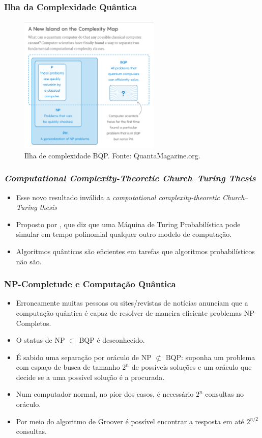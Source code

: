 \documentclass{beamer}
\begin{document}
\begin{frame}
  \frametitle{Ilha da Complexidade Quântica}
    \begin{figure}[h]
    \label{notph}
    \centering
    \includegraphics[width=0.6\textwidth]{island.jpg}
    \caption{Ilha de complexidade BQP. Fonte: QuantaMagazine.org.}
    \end{figure}
\end{frame}

\begin{frame}
\frametitle{\textit{Computational Complexity-Theoretic Church–Turing Thesis}} 
\begin{itemize}
  \item Esse novo resultado inválida a \textit{computational
    complexity-theoretic Church–Turing thesis}
  \item Proposto por \cite{be:97}, que diz que uma Máquina de Turing
  Probabilística pode simular em tempo polinomial qualquer outro
  modelo de computação.
  \item Algoritmos quânticos são eficientes em tarefas que
  algoritmos probabilísticos não são.
\end{itemize}
\end{frame}

\begin{frame}
\frametitle{NP-Completude e Computação Quântica} 
\begin{itemize}
  \item Erroneamente muitas pessoas ou sites/revistas de notícias
  anunciam que a computação quântica é capaz de resolver de maneira
  eficiente problemas NP-Completos.
  \item O status de NP $\subset$ BQP é desconhecido.
  \item É sabido uma separação por oráculo de NP $\not \subset$ BQP:
    suponha um problema com espaço de busca de tamanho $2^n$ de
  possíveis soluções e um oráculo que decide se a uma possível solução
  é a procurada.
  \item Num computador normal, no pior dos casos, é necessário $2^n$
  consultas no oráculo.
  \item Por meio do algoritmo de Groover \cite{gr:96} é possível
  encontrar a resposta em até $2^{n/2}$ consultas.
\end{itemize}
\end{frame}
\end{document}
